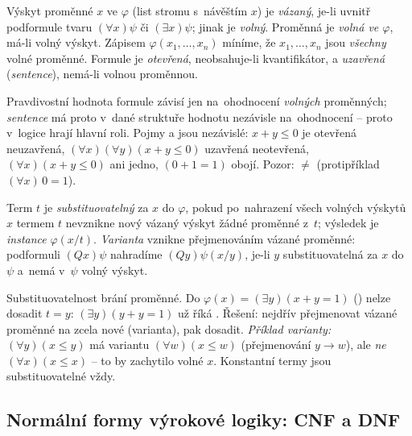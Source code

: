 \documentclass[11pt,a4paper]{article}
\begin{document}
\begin{definice}
Výskyt proměnné $x$ ve $\varphi$ (list stromu s~návěštím $x$) je \emph{vázaný}, je-li uvnitř podformule tvaru $(\forall x)\psi$ či $(\exists x)\psi$; jinak je \emph{volný}. Proměnná je \emph{volná ve $\varphi$}, má-li volný výskyt. Zápisem $\varphi(x_1,\dots,x_n)$ míníme, že $x_1,\dots,x_n$ jsou \emph{všechny} volné proměnné. Formule je \emph{otevřená}, neobsahuje-li kvantifikátor, a \emph{uzavřená} (\emph{sentence}), nemá-li volnou proměnnou.
\end{definice}

\begin{intuice}
Pravdivostní hodnota formule závisí jen na~ohodnocení \emph{volných} proměnných; \emph{sentence} má proto v~dané struktuře hodnotu nezávisle na~ohodnocení -- proto v~logice hrají hlavní roli. Pojmy  a  jsou nezávislé: $x{+}y\le 0$ je otevřená neuzavřená, $(\forall x)(\forall y)(x{+}y\le 0)$ uzavřená neotevřená, $(\forall x)(x{+}y\le 0)$ ani jedno, $(0{+}1{=}1)$ obojí. Pozor:  $\ne$  (protipříklad $(\forall x)\,0{=}1$).
\end{intuice}

\begin{definice}
Term $t$ je \emph{substituovatelný} za $x$ do $\varphi$, pokud po~nahrazení všech volných výskytů $x$ termem $t$ nevznikne nový vázaný výskyt žádné proměnné z~$t$; výsledek je \emph{instance} $\varphi(x/t)$. \emph{Varianta} vznikne přejmenováním vázané proměnné: podformuli $(Qx)\psi$ nahradíme $(Qy)\psi(x/y)$, je-li $y$ substituovatelná za $x$ do $\psi$ a~nemá v~$\psi$ volný výskyt.
\end{definice}

\begin{intuice}
Substituovatelnost brání  proměnné. Do $\varphi(x)=(\exists y)(x{+}y{=}1)$ () nelze dosadit $t=y$: $(\exists y)(y{+}y{=}1)$ už říká . Řešení: nejdřív přejmenovat vázané proměnné na zcela nové (varianta), pak dosadit. \emph{Příklad varianty:} $(\forall y)(x\le y)$ má variantu $(\forall w)(x\le w)$ (přejmenování $y\to w$), ale \emph{ne} $(\forall x)(x\le x)$ -- to by zachytilo volné $x$. Konstantní termy jsou substituovatelné vždy.
\end{intuice}

\subsection{Normální formy výrokové logiky: CNF a DNF}
\end{document}
